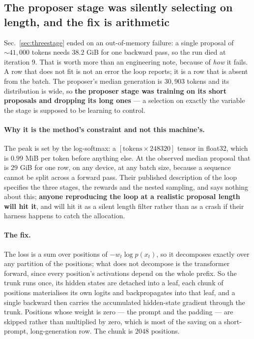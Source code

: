 \subsection{The proposer stage was silently selecting on length, and the fix is arithmetic}
\label{sec:chunkedloss}

Sec.~\ref{sec:threestage} ended on an out-of-memory failure: a single proposal of ${\sim}41{,}000$
tokens needs $38.2$ GiB for one backward pass, so the run died at iteration $9$. That is worth
more than an engineering note, because of \emph{how} it fails. A row that does not fit is not
an error the loop reports; it is a row that is absent from the batch. The proposer's median
generation is $30{,}903$ tokens and its distribution is wide, so \textbf{the proposer stage was
training on its short proposals and dropping its long ones} --- a selection on exactly the
variable the stage is supposed to be learning to control.

\paragraph{Why it is the method's constraint and not this machine's.} The peak is set by the
log-softmax: a $[\text{tokens} \times 248320]$ tensor in float32, which is $0.99$ MiB per token
before anything else. At the observed median proposal that is $29$ GiB for one row, on any
device, at any batch size, because a sequence cannot be split across a forward pass. Their
published description of the loop specifies the three stages, the rewards and the nested
sampling, and says nothing about this; \textbf{anyone reproducing the loop at a realistic
proposal length will hit it}, and will hit it as a silent length filter rather than as a crash
if their harness happens to catch the allocation.

\paragraph{The fix.} The loss is a sum over positions of $-w_t \log p(x_t)$, so it decomposes
exactly over any partition of the positions; what does not decompose is the transformer
forward, since every position's activations depend on the whole prefix. So the trunk runs once,
its hidden states are detached into a leaf, each chunk of positions materialises its own logits
and backpropagates into that leaf, and a single backward then carries the accumulated
hidden-state gradient through the trunk. Positions whose weight is zero --- the prompt and the
padding --- are skipped rather than multiplied by zero, which is most of the saving on a
short-prompt, long-generation row. The chunk is $2048$ positions.

